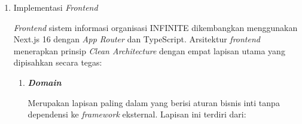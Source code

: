 \begin{enumerate}[listparindent=1cm]
\begin{enumerate}[listparindent=1cm, label=\alph*.]
                  \item \textbf{\textit{Job} Asinkron}

                        Sebanyak 20 \textit{job} asinkron dengan antrean diimplementasikan untuk kalkulasi poin prestasi, penghapusan berkas lama, serta menjaga sinkronisasi data antara sistem \textit{backend} dan sistem SSO INFINTE, meliputi pembuatan, pembaruan, dan penghapusan pengguna SSO; sinkronisasi massal pengguna; sinkronisasi keanggotaan grup, pengurus, dan administrator. Antrean didukung oleh Redis Sentinel untuk ketersediaan tinggi. Contoh kode program dapat dilihat pada 

                  \item \textbf{Penyimpanan Berkas dengan \textit{Object Storage}}

                        Penyimpanan berkas memanfaatkan \textit{object storage} untuk menyimpan berkas secara efisien dan skalabel. Informasi berkas disimpan dalam manifest JSON yang menyimpan informasi disk, visibilitas, jalur, dan nama berkas ke dalam kolom basis data. \textit{Cast} \texttt{Blob} mengubah manifest menjadi URL saat pembacaan. Berkas privat akan menghasilkan \textit{signed URL} dengan masa berlaku terbatas. Kode program \textit{cast} dapat dilihat pada 
            \end{enumerate}

      \item Implementasi \textit{Frontend}

            \textit{Frontend} sistem informasi organisasi INFINITE dikembangkan menggunakan Next.js 16 dengan \textit{App Router} dan TypeScript. Arsitektur \textit{frontend} menerapkan prinsip \textit{Clean Architecture} dengan empat lapisan utama yang dipisahkan secara tegas:

            \begin{enumerate}[listparindent=1cm, label=\alph*.]
                  \item \textbf{\textit{Domain}}

                        Merupakan lapisan paling dalam yang berisi aturan bisnis inti tanpa dependensi ke \textit{framework} eksternal. Lapisan ini terdiri dari:


\end{enumerate}
\end{enumerate}

